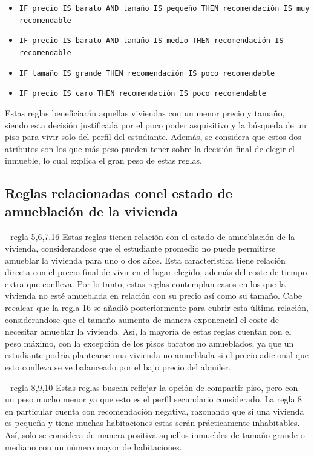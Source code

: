 \documentclass[12pt]{report} %
\begin{document}
    \begin{itemize}
        \item \texttt{IF precio IS barato AND tamaño IS pequeño THEN recomendación IS muy recomendable}
        \item \texttt{IF precio IS barato AND tamaño IS medio THEN recomendación IS recomendable}
        \item \texttt{IF tamaño IS grande THEN recomendación IS poco recomendable}
        \item \texttt{IF precio IS caro THEN recomendación IS poco recomendable}
    \end{itemize}

     Estas reglas beneficiarán aquellas viviendas con un menor precio y tamaño, siendo 
    esta decisión justificada por el poco poder asquisitivo y la búsqueda de un piso para vivir solo
    del perfil del estudiante. Además, se considera que estos dos atributos son los que más peso 
    pueden tener sobre la decisión final de elegir el inmueble, lo cual explica el gran peso de 
    estas reglas.

    \subsection{Reglas relacionadas conel estado de amueblación de la vivienda}

    - regla 5,6,7,16
    Estas reglas tienen relación con el estado de amueblación de la vivienda, considerandose que el 
    estudiante promedio no puede permitirse amueblar la vivienda para uno o dos años. 
    Esta caracteristica tiene relación directa con el precio final de vivir en el lugar elegido, 
    además del coste de tiempo extra que conlleva. Por lo tanto, estas reglas contemplan casos en 
    los que la vivienda no esté amueblada en relación con su precio así como su tamaño. Cabe recalcar
    que la regla 16 se añadió posteriormente para cubrir esta última relación, considerandose que el 
    tamaño aumenta de manera exponencial el coste de necesitar amueblar la vivienda. Así, la mayoría 
    de estas reglas cuentan con el peso máximo, con la excepción de los pisos baratos no amueblados, ya que un
    estudiante podría plantearse una vivienda no amueblada si el precio adicional que esto conlleva 
    se ve balanceado por el bajo precio del alquiler.

    - regla 8,9,10
    Estas reglas buscan reflejar la opción de compartir piso, pero con un peso mucho menor ya que esto 
    es el perfil secundario considerado. La regla 8 en particular cuenta con recomendación negativa, 
    razonando que si una vivienda es pequeña y tiene muchas habitaciones estas serán prácticamente 
    inhabitables. Así, solo se considera de manera positiva aquellos inmuebles de tamaño grande o mediano
    con un número mayor de habitaciones.
\end{document}

